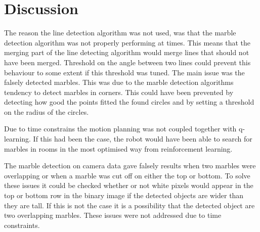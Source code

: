 \documentclass[../Head/Main.tex]{subfiles}
\begin{document}
\section{Discussion}

The reason the line detection algorithm was not used, was that the marble detection algorithm was not properly performing at times. This means that the merging part of the line detecting algorithm would merge lines that should not have been merged. Threshold on the angle between two lines could prevent this behaviour to some extent if this threshold was tuned. The main issue was the falsely detected marbles. This was due to the marble detection algorithms tendency to detect marbles in corners. This could have been prevented by detecting how good the points fitted the found circles and by setting a threshold on the radius of the circles. 

Due to time constrains the motion planning was not coupled together with q-learning. If this had been the case, the robot would have been able to search for marbles in rooms in the most optimised way from reinforcement learning. 

The marble detection on camera data gave falsely results when two marbles were overlapping or when a marble was cut off on either the top or bottom. To solve these issues it could be checked whether or not white pixels would appear in the top or bottom row in the binary image if the detected objects are wider than they are tall. If this is not the case it is a possibility that the detected object are two overlapping marbles. These issues were not addressed due to time constraints. 



   
\end{document}
